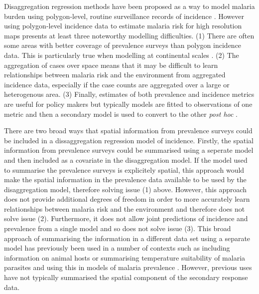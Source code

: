\documentclass[10pt,letterpaper]{article}
\begin{document}
Disaggregation regression methods have been proposed as a way to model malaria burden using polygon-level, routine surveillance records of incidence \cite{sturrock2014fine, wilson2017pointless, law2018variational, taylor2017continuous, li2012log}.
However using polygon-level incidence data to estimate malaria risk for high resolution maps presents at least three noteworthy modelling difficulties. 
(1) There are often some areas with better coverage of prevalence surveys than polygon incidence data. This is particularly true when modelling at continental scales \cite{weiss2019mapping, battle2019mapping}.
(2) The aggregation of cases over space means that it may be difficult to learn relationships between malaria risk and the environment from aggregated incidence data, especially if the case counts are aggregated over a large or heterogenous area.
(3) Finally, estimates of both prevalence and incidence metrics are useful for policy makers \cite{cohen2017mapping} but typically models are fitted to observations of one metric and then a secondary model is used to convert to the other \emph{post hoc} \cite{battle2019mapping, bhatt2015effect}.

There are two broad ways that spatial information from prevalence surveys could be included in a dissaggregation regression model of incidence.
Firstly, the spatial information from prevalence surveys could be summarised using a seperate model and then included as a covariate in the disaggregation model.
If the model used to summarise the prevalence surveys is explicitely spatial, this approach would make the spatial information in the prevalence data available to be used by the disaggregation model, therefore solving issue (1) above.
However, this approach does not provide additional degrees of freedom in order to more accurately learn relationships between malaria risk and the environment and therefore does not solve issue (2).
Furthermore, it does not allow joint predictions of incidence and prevalence from a single model and so does not solve issue (3).
This broad approach of summarising the information in a different data set using a separate model has previously been used in a number of contexts such as including information on animal hosts \cite{shearer2016estimating} or summarising temperature suitability of malaria parasites \cite{weiss2014air} and using this in models of malaria prevalence \cite{bhatt2015effect, weiss2019mapping}.
However, previous uses have not typically summarised the spatial component of the secondary response data.
\end{document}
